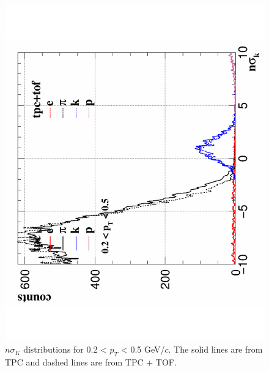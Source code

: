 \documentclass[a4paper]{article}
\begin{document}
\begin{figure}[htbp]
\begin{minipage}[htbp]{0.52\linewidth}
\centering
\includegraphics[width=1.0\textwidth,angle=-90]{fig/tofMatch_Hijing_nSigmaK1.pdf}
\caption{$n\sigma_{K}$ distributions for 0.2 < $p_T$ < 0.5 GeV/$c$. The solid lines are from TPC and dashed lines are from TPC + TOF.\label{fig:tpck1}}
\end{minipage}
\hfill
\begin{minipage}[htbp]{0.52\linewidth}
\centering

\end{minipage}
\end{figure}
\end{document}
